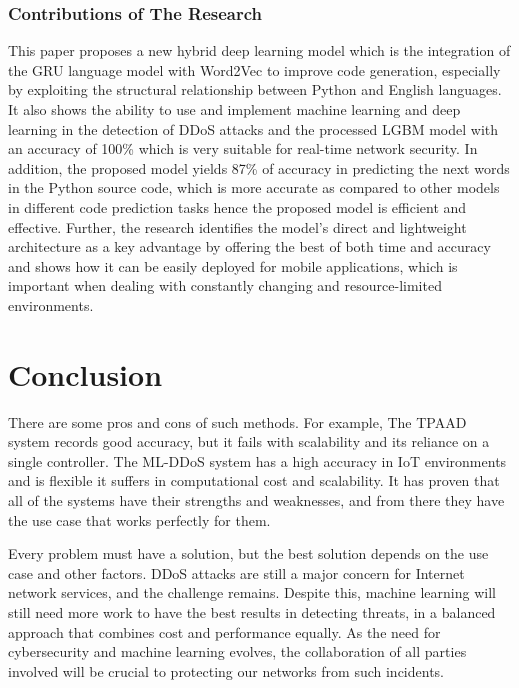 \documentclass[a4paper, 12pt]{article}
\begin{document}
\subsubsection{Contributions of The Research}
This paper proposes a new hybrid deep learning model which is the integration of the GRU language model with Word2Vec to improve code generation, especially by exploiting the structural relationship between Python and English languages. It also shows the ability to use and implement machine learning and deep learning in the detection of DDoS attacks and the processed LGBM model with an accuracy of 100\% which is very suitable for real-time network security. In addition, the proposed model yields 87\% of accuracy in predicting the next words in the Python source code, which is more accurate as compared to other models in different code prediction tasks hence the proposed model is efficient and effective. Further, the research identifies the model’s direct and lightweight architecture as a key advantage by offering the best of both time and accuracy and shows how it can be easily deployed for mobile applications, which is important when dealing with constantly changing and resource-limited environments.

\clearpage

\section{Conclusion}

There are some pros and cons of such methods. For example, The TPAAD system records good accuracy, but it fails with scalability and its reliance on a single controller.  The ML-DDoS system has a high accuracy in IoT environments and is flexible it suffers in computational cost and scalability.  It has proven that all of the systems have their strengths and weaknesses, and from there they have the use case that works perfectly for them. 

Every problem must have a solution, but the best solution depends on the use case and other factors. DDoS attacks are still a major concern for Internet network services, and the challenge remains. Despite this, machine learning will still need more work to have the best results in detecting threats, in a balanced approach that combines cost and performance equally. As the need for cybersecurity and machine learning evolves, the collaboration of all parties involved will be crucial to protecting our networks from such incidents. 
\end{document}
